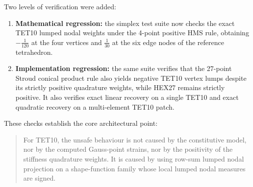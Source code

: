 Two levels of verification were added:
\begin{enumerate}[nosep]
  \item \textbf{Mathematical regression:} the simplex test suite now checks the
        exact TET10 lumped nodal weights under the 4-point positive HMS rule,
        obtaining
        $-\frac{1}{120}$ at the four vertices and $\frac{1}{30}$ at the six
        edge nodes of the reference tetrahedron.
  \item \textbf{Implementation regression:} the same suite verifies that the
        27-point Stroud conical product rule also yields negative TET10 vertex
        lumps despite its strictly positive quadrature weights, while HEX27
        remains strictly positive.  It also verifies exact linear recovery on a
        single TET10 and exact quadratic recovery on a multi-element TET10
        patch.
\end{enumerate}

These checks establish the core architectural point:
\begin{quote}
For TET10, the unsafe behaviour is not caused by the constitutive model, nor by
the computed Gauss-point strains, nor by the positivity of the stiffness
quadrature weights.  It is caused by using row-sum lumped nodal projection on a
shape-function family whose local lumped nodal measures are signed.
\end{quote}
